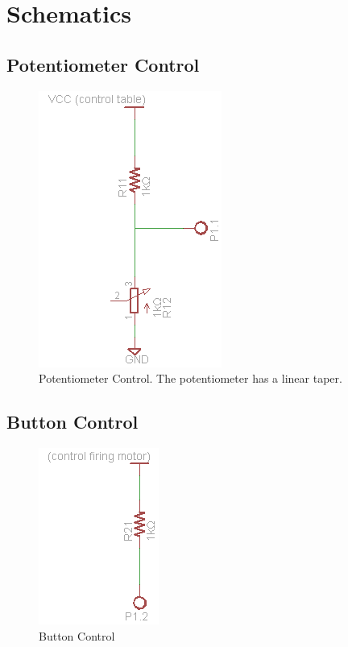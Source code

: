 \documentclass[a4paper, 11pt]{article}
\begin{document}
\section{Schematics}
	\subsection{Potentiometer Control}
	\begin{figure}[!ht]
		\centering
		\includegraphics{potentiometer-control}
		\caption{Potentiometer Control.  The potentiometer has a linear taper.}
	\end{figure}
	\subsection{Button Control}
	\begin{figure}[!ht]
		\centering
		\includegraphics{button-control}
		\caption{Button Control}
	\end{figure}
\end{document}

